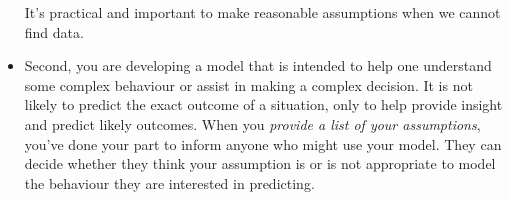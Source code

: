 \begin{example}
\begin{itemize}
		It's practical and important to make reasonable assumptions when we cannot find data.

	\item Second, you are developing a model that is intended to help one understand some complex behaviour or assist in making a complex decision. It is not likely to predict the exact outcome of a situation, only to help provide insight and predict likely outcomes. When you \emph{provide a list of your assumptions}, you've done your part to inform anyone who might use your model. They can decide whether they think your assumption is or is not appropriate to model the behaviour they are interested in predicting.

\end{itemize} 

	
\end{example}





